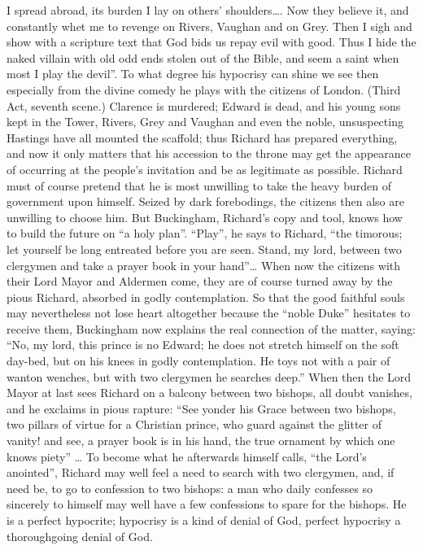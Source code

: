 \documentclass[12pt,a4paper,openany]{book}
\newcommand{\opage}[1]{\marginnote{\footnotesize\textit{[#1]}}}
\begin{document}
I spread abroad, its burden I lay on others' shoulders\dots{}.
Now they believe it, and constantly whet me
to revenge on Rivers, Vaughan and on Grey. Then I sigh
and show with a scripture text that God bids us repay evil
with good. Thus I hide the naked
villain with old odd ends stolen out of the Bible, and
seem a saint when most I play the devil''. To what degree
his hypocrisy can shine we see then especially from the divine
comedy he plays with the citizens of London.
(Third Act, seventh scene.) Clarence is murdered; Edward
is dead, and his young sons kept in the Tower,
Rivers, Grey and Vaughan and even the noble, unsuspecting
Hastings have all mounted the scaffold; thus
Richard has prepared everything, and now it only matters that
his accession to the throne may get the appearance of occurring at
the people's invitation and be as legitimate as possible.
Richard must of course pretend that he is most unwilling to
take the heavy burden of government upon himself. Seized by dark
forebodings, the citizens then also are unwilling to choose him.
But Buckingham, Richard's copy and tool, knows how to
build the future on ``a holy plan''. ``Play'', he says to
Richard, ``the timorous; let yourself be long entreated before
you are seen. Stand, my lord, between two clergymen and take a
prayer book in your hand''\dots{} When now the citizens with their
Lord Mayor and Aldermen come, they are of course
turned away by the pious Richard, absorbed in godly contemplation.
So that the good faithful souls may nevertheless not
lose heart altogether because the ``noble Duke''
\setcounter{footnote}{0}%
\opage{535}hesitates to receive them, Buckingham now explains the
real connection of the matter, saying: ``No, my lord,
this prince is no Edward; he does not stretch himself
on the soft day-bed, but on his knees in godly contemplation.
He toys not with a pair of wanton wenches, but
with two clergymen he searches deep.'' When then the Lord
Mayor at last sees Richard on a balcony between two
bishops, all doubt vanishes, and he exclaims in pious
rapture: ``See yonder his Grace between two bishops,
two pillars of virtue for a Christian prince, who
guard against the glitter of vanity! and see, a prayer book
is in his hand, the true ornament by which one
knows piety'' \dots{} To become what he afterwards himself
calls, ``the Lord's anointed'', Richard may well feel
a need to search with two clergymen, and, if need
be, to go to confession to two bishops: a man who daily
confesses so sincerely to himself may well have a few
confessions to spare for the bishops. He is a perfect
hypocrite; hypocrisy is a kind of denial of God, perfect
hypocrisy a thoroughgoing denial of God.
\end{document}
